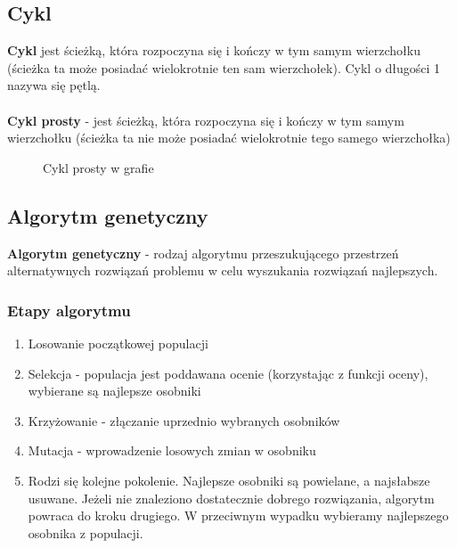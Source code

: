 \documentclass[a4paper,12pt]{article}
\begin{document}
\subsection{Cykl}
\textbf{Cykl} jest ścieżką, która rozpoczyna się i kończy w tym samym wierzchołku (ścieżka ta może posiadać wielokrotnie ten sam wierzchołek). Cykl o długości 1 nazywa się pętlą.
\\
\\
\textbf{Cykl prosty} - jest ścieżką, która rozpoczyna się i kończy w tym samym wierzchołku (ścieżka ta nie może posiadać wielokrotnie tego samego wierzchołka)
\begin{figure}[htbp]
\caption{Cykl prosty w grafie}
\end{figure}
\subsection{Algorytm genetyczny}
\textbf{Algorytm genetyczny} - rodzaj algorytmu przeszukującego przestrzeń alternatywnych rozwiązań problemu w celu wyszukania rozwiązań najlepszych.
\subsubsection{Etapy algorytmu}
\begin{enumerate}
\item Losowanie początkowej populacji
\item Selekcja - populacja jest poddawana ocenie (korzystając z funkcji oceny), wybierane są najlepsze osobniki
\item Krzyżowanie - złączanie uprzednio wybranych osobników
\item Mutacja - wprowadzenie losowych zmian w osobniku
\item Rodzi się kolejne pokolenie. Najlepsze osobniki są powielane, a najsłabsze usuwane. Jeżeli nie znaleziono dostatecznie dobrego rozwiązania, algorytm powraca do kroku drugiego. W przeciwnym wypadku wybieramy najlepszego osobnika z populacji.
\end{enumerate}
\end{document}
